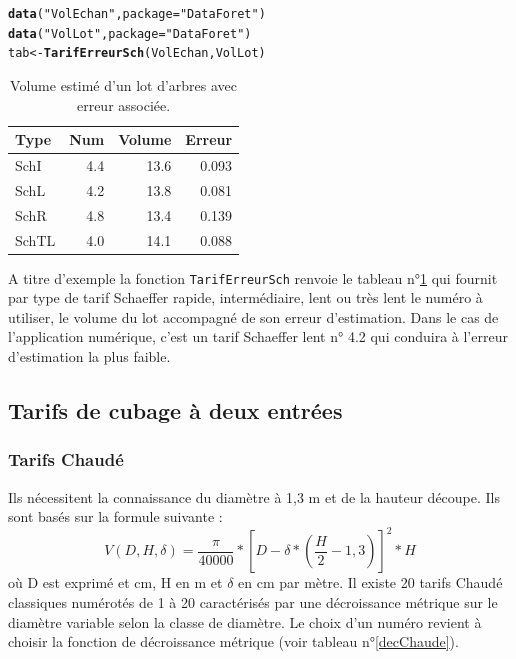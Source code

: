 \documentclass{article}\usepackage[]{graphicx}\usepackage[]{color}
\makeatletter
\newcommand{\hlstr}[1]{\textcolor[rgb]{0.192,0.494,0.8}{#1}}%
\newcommand{\hlstd}[1]{\textcolor[rgb]{0.345,0.345,0.345}{#1}}%
\newcommand{\hlkwb}[1]{\textcolor[rgb]{0.69,0.353,0.396}{#1}}%
\newcommand{\hlkwc}[1]{\textcolor[rgb]{0.333,0.667,0.333}{#1}}%
\newcommand{\hlkwd}[1]{\textcolor[rgb]{0.737,0.353,0.396}{\textbf{#1}}}%
\newenvironment{kframe}{%
 \def\at@end@of@kframe{}%
 \ifinner\ifhmode%
  \def\at@end@of@kframe{\end{minipage}}%
  \begin{minipage}{\columnwidth}%
 \fi\fi%
 \def\FrameCommand##1{\hskip\@totalleftmargin \hskip-\fboxsep
 \colorbox{shadecolor}{##1}\hskip-\fboxsep
     \hskip-\linewidth \hskip-\@totalleftmargin \hskip\columnwidth}%
 \MakeFramed {\advance\hsize-\width
   \@totalleftmargin\z@ \linewidth\hsize
   \@setminipage}}%
 {\par\unskip\endMakeFramed%
 \at@end@of@kframe}
\newenvironment{knitrout}{}{} %
\makeatother
\begin{document}
\begin{knitrout}\small
{}\color{fgcolor}\begin{kframe}
\begin{alltt}
\hlkwd{data}\hlstd{(}\hlstr{"VolEchan"}\hlstd{,} \hlkwc{package} \hlstd{=} \hlstr{"DataForet"}\hlstd{)}
\hlkwd{data}\hlstd{(}\hlstr{"VolLot"}\hlstd{,} \hlkwc{package} \hlstd{=} \hlstr{"DataForet"}\hlstd{)}
\hlstd{tab} \hlkwb{<-} \hlkwd{TarifErreurSch}\hlstd{(VolEchan, VolLot)}
\end{alltt}
\end{kframe}
\end{knitrout}

\begin{table}[ht]
\centering
\begingroup\small
\begin{tabular}{lrrr}
  \hline
Type & Num & Volume & Erreur \\ 
  \hline
SchI & 4.4 & 13.6 & 0.093 \\ 
  SchL & 4.2 & 13.8 & 0.081 \\ 
  SchR & 4.8 & 13.4 & 0.139 \\ 
  SchTL & 4.0 & 14.1 & 0.088 \\ 
   \hline
\end{tabular}
\endgroup
\caption{Volume estimé d'un lot d'arbres avec erreur associée.} 
\label{ErreurTarif}
\end{table}


A titre d'exemple la fonction \texttt{TarifErreurSch} renvoie le tableau n°\ref{ErreurTarif} qui fournit par type de tarif Schaeffer rapide, intermédiaire, lent ou très lent le numéro à utiliser, le volume du lot accompagné de son erreur d'estimation. Dans le cas de l'application numérique, c'est un tarif Schaeffer lent n° 4.2 qui conduira à l'erreur d'estimation la plus faible.

\subsection{Tarifs de cubage à deux entrées}

\subsubsection{Tarifs Chaudé}
Ils nécessitent la connaissance du diamètre à 1,3 m et de la hauteur découpe. Ils sont basés sur la formule suivante :
\begin{displaymath}
V(D,H,\delta) = \frac{\pi}{40000}*[D - \delta*(\frac{H}{2} - 1,3)]^2 * H
\end{displaymath}
où D est exprimé et cm, H en m et $ \delta $ en cm par mètre.
Il existe 20 tarifs Chaudé classiques numérotés de 1 à 20 caractérisés par une décroissance métrique sur le diamètre variable selon la classe de diamètre. Le choix d'un numéro revient à choisir la fonction de décroissance métrique (voir tableau n°\ref{decChaude}).
\end{document}
